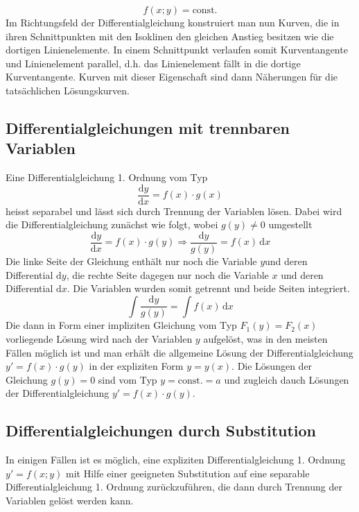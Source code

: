 \begin{equation}
\boxed{f\left(x; y\right)=\text{const.}}
\end{equation}
Im Richtungsfeld der Differentialgleichung konstruiert man nun Kurven, die in ihren Schnittpunkten mit den Isoklinen den gleichen Anstieg besitzen wie die dortigen Linienelemente. In einem Schnittpunkt verlaufen somit Kurventangente und Linienelement parallel, d.h. das Linienelement fällt in die dortige Kurventangente. Kurven mit dieser Eigenschaft sind dann Näherungen für die tatsächlichen Lösungskurven.
\subsection{Differentialgleichungen mit trennbaren Variablen}
Eine Differentialgleichung 1. Ordnung vom Typ 
\begin{equation}
\boxed{\dfrac{\text{d}y}{\text{d}x}=f\left(x\right)\cdot g\left(x\right)}
\end{equation}
heisst separabel und lässt sich durch Trennung der Variablen lösen. Dabei wird die Differentialgleichung zunächst wie folgt, wobei $g\left(y\right)\neq 0$ umgestellt
\begin{equation}
\boxed{\dfrac{\text{d}y}{\text{d}x}=f\left(x\right)\cdot g\left(y\right)\Longrightarrow \dfrac{\text{d}y}{g\left(y\right)}=f\left(x\right)\,\text{d}x}
\end{equation}
Die linke Seite der Gleichung enthält nur noch die Variable $y$und deren Differential $\text{d}y$, die rechte Seite dagegen nur noch die Variable $x$ und deren Differential $\text{d}x$. Die Variablen wurden somit getrennt und beide Seiten integriert.
\begin{equation}
\boxed{\displaystyle \int \dfrac{\text{d}y}{g\left(y\right)}=\displaystyle \int f\left(x\right)\,\text{d}x}
\end{equation}
Die dann in Form einer impliziten Gleichung vom Typ $F_1\left(y\right)=F_2\left(x\right)$ vorliegende Lösung wird nach der Variablen $y$ aufgelöst, was in den meisten Fällen möglich ist und man erhält die allgemeine Lösung der Differentialgleichung $y'=f\left(x\right)\cdot g\left(y\right)$ in der expliziten Form $y=y\left(x\right)$. Die Lösungen der Gleichung $g\left(y\right)=0$ sind vom Typ $y=\text{const.}=a$ und zugleich dauch Lösungen der Differentialgleichung $y'=f\left(x\right)\cdot g\left(y\right)$.
\subsection{Differentialgleichungen durch Substitution}
In einigen Fällen ist es möglich, eine expliziten Differentialgleichung 1. Ordnung $y'=f\left(x; y\right)$ mit Hilfe einer geeigneten Substitution auf eine separable Differentialgleichung 1. Ordnung zurückzuführen, die dann durch Trennung der Variablen gelöst werden kann. 
